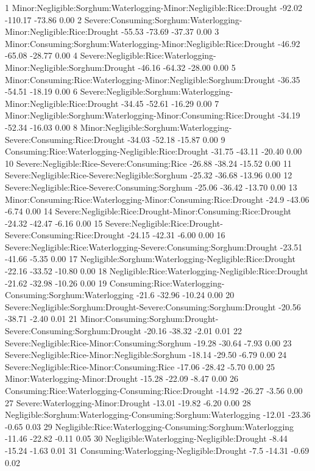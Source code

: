 \documentclass[12pt,oneside]{article}
\begin{document}
1 Minor:Negligible:Sorghum:Waterlogging-Minor:Negligible:Rice:Drought -92.02 -110.17 -73.86 0.00
2 Severe:Consuming:Sorghum:Waterlogging-Minor:Negligible:Rice:Drought -55.53 -73.69 -37.37 0.00
3 Minor:Consuming:Sorghum:Waterlogging-Minor:Negligible:Rice:Drought -46.92 -65.08 -28.77 0.00
4 Severe:Negligible:Rice:Waterlogging-Minor:Negligible:Sorghum:Drought -46.16 -64.32 -28.00 0.00
5 Minor:Consuming:Rice:Waterlogging-Minor:Negligible:Sorghum:Drought -36.35 -54.51 -18.19 0.00
6 Severe:Negligible:Sorghum:Waterlogging-Minor:Negligible:Rice:Drought -34.45 -52.61 -16.29 0.00
7 Minor:Negligible:Sorghum:Waterlogging-Minor:Consuming:Rice:Drought -34.19 -52.34 -16.03 0.00
8 Minor:Negligible:Sorghum:Waterlogging-Severe:Consuming:Rice:Drought -34.03 -52.18 -15.87 0.00
9 Consuming:Rice:Waterlogging-Negligible:Rice:Drought -31.75 -43.11 -20.40 0.00
10 Severe:Negligible:Rice-Severe:Consuming:Rice -26.88 -38.24 -15.52 0.00
11 Severe:Negligible:Rice-Severe:Negligible:Sorghum -25.32 -36.68 -13.96 0.00
12 Severe:Negligible:Rice-Severe:Consuming:Sorghum -25.06 -36.42 -13.70 0.00
13 Minor:Consuming:Rice:Waterlogging-Minor:Consuming:Rice:Drought -24.9 -43.06 -6.74 0.00
14 Severe:Negligible:Rice:Drought-Minor:Consuming:Rice:Drought -24.32 -42.47 -6.16 0.00
15 Severe:Negligible:Rice:Drought-Severe:Consuming:Rice:Drought -24.15 -42.31 -6.00 0.00
16 Severe:Negligible:Rice:Waterlogging-Severe:Consuming:Sorghum:Drought -23.51 -41.66 -5.35 0.00
17 Negligible:Sorghum:Waterlogging-Negligible:Rice:Drought -22.16 -33.52 -10.80 0.00
18 Negligible:Rice:Waterlogging-Negligible:Rice:Drought -21.62 -32.98 -10.26 0.00
19 Consuming:Rice:Waterlogging-Consuming:Sorghum:Waterlogging -21.6 -32.96 -10.24 0.00
20 Severe:Negligible:Sorghum:Drought-Severe:Consuming:Sorghum:Drought -20.56 -38.71 -2.40 0.01
21 Minor:Consuming:Sorghum:Drought-Severe:Consuming:Sorghum:Drought -20.16 -38.32 -2.01 0.01
22 Severe:Negligible:Rice-Minor:Consuming:Sorghum -19.28 -30.64 -7.93 0.00
23 Severe:Negligible:Rice-Minor:Negligible:Sorghum -18.14 -29.50 -6.79 0.00
24 Severe:Negligible:Rice-Minor:Consuming:Rice -17.06 -28.42 -5.70 0.00
25 Minor:Waterlogging-Minor:Drought -15.28 -22.09 -8.47 0.00
26 Consuming:Rice:Waterlogging-Consuming:Rice:Drought -14.92 -26.27 -3.56 0.00
27 Severe:Waterlogging-Minor:Drought -13.01 -19.82 -6.20 0.00
28 Negligible:Sorghum:Waterlogging-Consuming:Sorghum:Waterlogging -12.01 -23.36 -0.65 0.03
29 Negligible:Rice:Waterlogging-Consuming:Sorghum:Waterlogging -11.46 -22.82 -0.11 0.05
30 Negligible:Waterlogging-Negligible:Drought -8.44 -15.24 -1.63 0.01
31 Consuming:Waterlogging-Negligible:Drought -7.5 -14.31 -0.69 0.02
\end{document}
